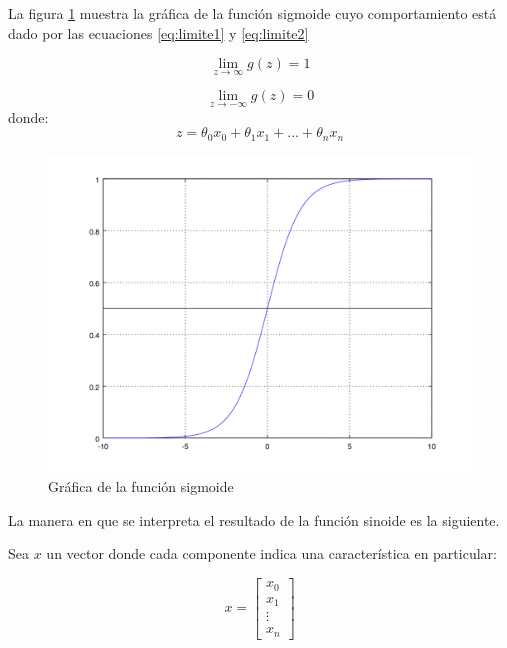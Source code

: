 La figura \ref{fig:sigmoide} muestra la gr\'afica de la funci\'on sigmoide cuyo comportamiento est\'a dado por las ecuaciones \ref{eq:limite1} y \ref{eq:limite2}

\begin{equation}\label{eq:limite1}
\lim_{z \to \infty} g(z) = 1
\end{equation}

\begin{equation}\label{eq:limite2}
\lim_{z \to -\infty} g(z) = 0
\end{equation}
donde:
\begin{equation}
z = \theta_{0}x_{0}+ \theta_{1}x_{1} + ... +  \theta_{n}x_{n}
\end{equation}

\begin{figure}[h]
	\begin{center}
		\includegraphics[scale=.5]{images/sigmoide}
		\caption{Gr\'afica de la funci\'on sigmoide}
		\label{fig:sigmoide}
	\end{center}
\end{figure}

La manera en que se interpreta el resultado de la funci\'on sinoide es la siguiente.

Sea $x$ un vector donde cada componente indica una caracter\'istica en particular:

\begin{equation}
x  = 
\begin{bmatrix}
x_{0} \\
x_{1} \\
\vdots \\
x_{n}
\end{bmatrix}
\end{equation}

